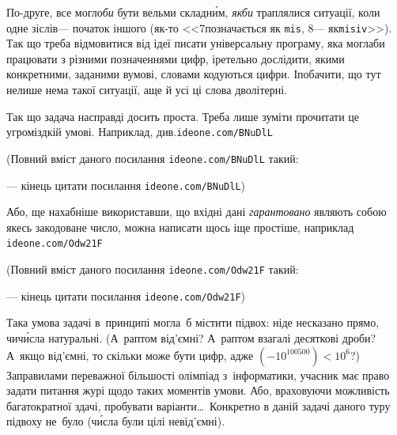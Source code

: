 \documentclass[14pt,a4paper]{extarticle}
\renewcommand{\baselinestretch}{1.3125}
\begin{document}
По-друге, все могло\nolinebreak[3] \emph{би} бути вельми складн\'{и}м, \emph{якби} траплялися ситуації, коли одне зі\nolinebreak[2] слів\nolinebreak[3] --- початок іншого (як-то <<7\nolinebreak[3] позначається як \texttt{mis}, 8\nolinebreak[3] --- як\nolinebreak[2] \texttt{misiv}>>). Так що треба відмовитися від ідеї писати універсальну програму, яка могла\nolinebreak[3] би працювати з різними позначеннями цифр, і\nolinebreak[3] ретельно дослідити, якими конкретними, заданими в\nolinebreak[3] умові, словами кодуються цифри. І\nolinebreak[3] побачити, що тут не\nolinebreak[3] лише нема такої ситуації, а\nolinebreak[3] ще й усі ці слова дволітерні. 

Так що задача насправді досить проста. Треба лише зуміти прочитати це у\nolinebreak[3] громіздкій умові. Наприклад, див.\nolinebreak[2] 
\verb"ideone.com/BNuDlL"


{\color{green}\begin{small}

\renewcommand{\baselinestretch}{0.875}

(Повний вміст даного посилання \verb"ideone.com/BNuDlL" такий:

--- кінець цитати посилання \verb"ideone.com/BNuDlL")

\end{small}}


\hspace{0.5em plus 1em} Або, ще нахабніше використавши, що вхідні дані \emph{гарантовано} являють собою якесь закодоване число, можна написати щось іще простіше, наприклад 
\verb"ideone.com/Odw21F"


{\color{green}\begin{small}

\renewcommand{\baselinestretch}{0.875}

(Повний вміст даного посилання \verb"ideone.com/Odw21F" такий:

--- кінець цитати посилання \verb"ideone.com/Odw21F")

\end{small}}




Така умова задачі в~принципі могла~б містити підвох: ніде не\nolinebreak[3] сказано прямо, чи\nolinebreak[3] ч\'{и}сла натуральні. (А~раптом від'ємні? А~раптом взагалі десяткові дроби? А~якщо від'ємні, то скільки може бути цифр, адже ${({-}10^{100500}){<}10^6}$?) За\nolinebreak[3] правилами переважної більшості олімпіад з~інформатики, учасник має право задати питання журі щодо таких моментів умови. Або, враховуючи можливість багатократної здачі, пробувати варіанти\dots\ Конкретно в даній задачі даного туру підвоху не~було (ч\'{и}сла були цілі невід'ємні).
\end{document}
